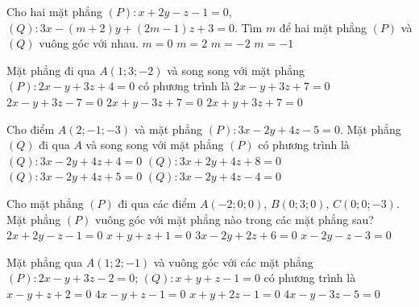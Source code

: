 \begin{ex}
	Cho hai mặt phẳng $(P)\colon x+2y-z-1=0$, $(Q)\colon 3x-(m+2)y+(2m-1)z+3=0$. Tìm $m$ để hai mặt phẳng $(P)$ và $(Q)$ vuông góc với nhau.
	\choice
	{\True $m=0$}
	{$m=2$}
	{$m=-2$}
	{$m=-1$}
\end{ex}

\begin{ex}%
	Mặt phẳng đi qua $A(1;3;-2)$ và song song với mặt phẳng $(P) \colon 2x-y+3z+4=0$ có phương trình là
	\choice
	{\True $2x-y+3z+7=0$}
	{$2x-y+3z-7=0$}
	{$2x+y-3z+7=0$}
	{$2x+y+3z+7=0$}
\end{ex}


\begin{ex}%
	Cho điểm $A(2;-1;-3)$ và mặt phẳng $(P)\colon 3x-2y+4z-5=0$. Mặt phẳng $(Q)$ đi qua $A$ và song song với mặt phẳng $(P)$ có phương trình là
	\choice
	{\True $(Q)\colon 3x-2y+4z+4=0$}
	{$(Q)\colon 3x+2y+4z+8=0$}
	{$(Q)\colon 3x-2y+4z+5=0$}
	{$(Q)\colon 3x-2y+4z-4=0$}
\end{ex}

\begin{ex}
	Cho mặt phẳng $(P)$ đi qua các điểm $A(-2; 0; 0)$, $B(0; 3; 0)$, $C(0; 0; -3)$. Mặt phẳng $(P)$ vuông góc với mặt phẳng nào trong các mặt phẳng sau?
	\choice
	{\True $2x+2y-z-1=0$}
	{$x+y+z+1=0$}
	{$3x-2y+2z+6=0$}
	{$x-2y-z-3=0$}
\end{ex}

\begin{ex}
	Mặt phẳng qua $A(1;2;-1)$ và vuông góc với các mặt phẳng $(P) \colon 2x-y+3z-2=0$; $(Q) \colon x+y+z-1=0$ có phương trình là
	\choice
	{$x-y+z+2=0$}
	{$4x-y+z-1=0$}
	{$x+y+2z-1=0$}
	{\True $4x-y-3z-5=0$}
\end{ex}

